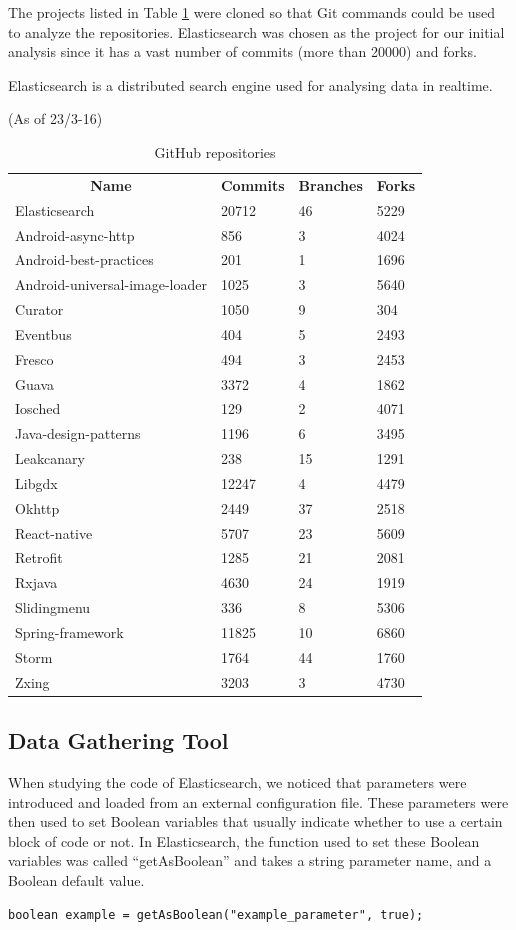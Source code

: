 The projects listed in Table \ref{table:repositories} were cloned so that Git commands could be used to analyze the repositories. Elasticsearch was chosen as the project for our initial analysis since it has a vast number of commits (more than 20000) and forks.

Elasticsearch is a distributed search engine used for analysing data in realtime.  %

(As of 23/3-16)\\
\begin{table}
\caption{GitHub repositories}\label{table:repositories}
\begin{tabular}{ l l l l}
\hline
\multicolumn{1}{c}{\textbf{Name}} & \multicolumn{1}{c}{\textbf{Commits}} & \multicolumn{1}{c}{\textbf{Branches}} & \multicolumn{1}{c}{\textbf{Forks}}\\
Elasticsearch & 20712 & 46 & 5229\\
Android-async-http & 856 & 3 & 4024\\
Android-best-practices & 201 & 1 & 1696\\
Android-universal-image-loader & 1025 & 3 & 5640\\
Curator & 1050 & 9 & 304\\
Eventbus & 404 & 5 & 2493\\
Fresco & 494 & 3 & 2453\\
Guava & 3372 & 4 & 1862\\
Iosched & 129 & 2 & 4071\\
Java-design-patterns & 1196 & 6 & 3495\\
Leakcanary & 238 & 15 & 1291\\
Libgdx & 12247 & 4 & 4479\\
Okhttp & 2449 & 37 & 2518\\
React-native & 5707 & 23 & 5609\\
Retrofit & 1285 & 21 & 2081\\
Rxjava & 4630 & 24 & 1919\\
Slidingmenu & 336 & 8 & 5306\\
Spring-framework & 11825 & 10 & 6860\\
Storm & 1764 & 44 & 1760\\
Zxing & 3203 & 3 & 4730
\end{tabular}
\end{table}
\subsection{Data Gathering Tool}
When studying the code of Elasticsearch, we noticed that parameters were introduced and loaded from an external configuration file. These parameters were then used to set Boolean variables that usually indicate whether to use a certain block of code or not. In Elasticsearch, the function used to set these Boolean variables was called “getAsBoolean” and takes a string parameter name, and a Boolean default value.\\
\lstset{language=Java}
\begin{lstlisting}[frame=single]
boolean example = getAsBoolean("example_parameter", true);
\end{lstlisting}

